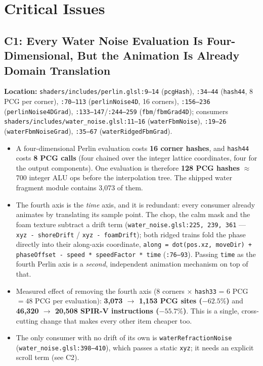 \documentclass[11pt,a4paper]{article}
\begin{document}
\section{Critical Issues}

\subsection{C1: Every Water Noise Evaluation Is Four-Dimensional, But the Animation Is Already Domain Translation}

\textbf{Location:} \texttt{shaders/includes/perlin.glsl:9--14} (\texttt{pcgHash}), \texttt{:34--44} (\texttt{hash44}, 8 PCG
per corner), \texttt{:70--113} (\texttt{perlinNoise4D}, 16 corners), \texttt{:156--236} (\texttt{perlinNoise4DGrad}),
\texttt{:133--147}/\texttt{:244--259} (\texttt{fbm}/\texttt{fbmGrad4D}); consumers
\texttt{shaders/includes/water\_noise.glsl:11--16} (\texttt{waterFbmNoise}), \texttt{:19--26}
(\texttt{waterFbmNoiseGrad}), \texttt{:35--67} (\texttt{waterRidgedFbmGrad}).

\begin{itemize}
    \item A four-dimensional Perlin evaluation costs \textbf{16 corner hashes}, and \texttt{hash44} costs \textbf{8 PCG
    calls} (four chained over the integer lattice coordinates, four for the output components). One evaluation is
    therefore \textbf{128 PCG hashes} $\approx$ 700 integer ALU ops before the interpolation tree. The shipped water
    fragment module contains 3,073 of them.
    \item The fourth axis is the \emph{time} axis, and it is redundant: every consumer already animates by translating
    its sample point. The chop, the calm mask and the foam texture subtract a drift term
    (\texttt{water\_noise.glsl:225, 239, 361} --- \texttt{xyz - shoreDrift} / \texttt{xyz - foamDrift}); both ridged
    trains fold the phase directly into their along-axis coordinate,
    \texttt{along = dot(pos.xz, moveDir) + phaseOffset - speed * speedFactor * time} (\texttt{:76--93}). Passing
    \texttt{time} as the fourth Perlin axis is a \emph{second}, independent animation mechanism on top of that.
    \item Measured effect of removing the fourth axis (8 corners $\times$ \texttt{hash33} = 6 PCG $=48$ PCG per
    evaluation): \textbf{3,073 $\rightarrow$ 1,153 PCG sites ($-62.5\%$)} and \textbf{46,320 $\rightarrow$ 20,508 SPIR-V
    instructions ($-55.7\%$)}. This is a single, cross-cutting change that makes every other item cheaper too.
    \item The only consumer with no drift of its own is \texttt{waterRefractionNoise}
    (\texttt{water\_noise.glsl:398--410}), which passes a static \texttt{xyz}; it needs an explicit scroll term
    (see C2).
\end{itemize}
\end{document}

